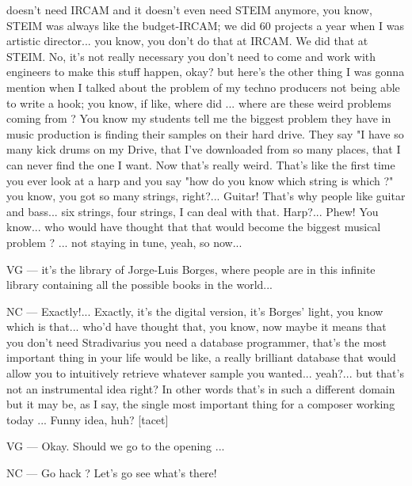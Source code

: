 doesn't need IRCAM and it doesn't even need STEIM anymore, you know, STEIM was always like the budget-IRCAM; we did 60 projects a year when I was artistic director... you know, you don't do that at IRCAM. We did that at STEIM. No, it's not really necessary you don't need to come and work with engineers to make this stuff happen, okay? but here's the other thing I was gonna mention when I talked about the problem of my techno producers not being able to write a hook; you know, if like, where did ... where are these weird problems coming from ? You know my students tell me the biggest problem they have in music production is finding their samples on their hard drive. They say "I have so many kick drums on my Drive, that I've downloaded from so many places, that I can never find the one I want. Now that's really weird. That's like the first time you ever look at a harp and you say "how do you know which string is which ?" you know, you got so many strings, right?... Guitar! That's why people like guitar and bass... six strings, four strings, I can deal with that. Harp?... Phew! You know... who would have thought that that would become the biggest musical problem ? ... not staying in tune, yeah, so now... 

VG — it's the library of Jorge-Luis Borges,  where people are in this infinite library containing all the possible  books in the world... 

NC — Exactly!... Exactly, it's the digital version, it's Borges' light, you know which is that... who'd have thought that, you know,  now maybe it means that you don't need Stradivarius you need a database programmer, that's the most important thing in your life would be like, a really brilliant database that would allow you to intuitively retrieve whatever sample you wanted... yeah?... but that's not an instrumental  idea right? In other words that's in such a different domain but it may be, as I say, the single most important thing for a composer working today ... Funny idea, huh? [tacet] 

VG — Okay. Should we go to the opening ... 

NC — Go hack ? Let's go see what's there! 
